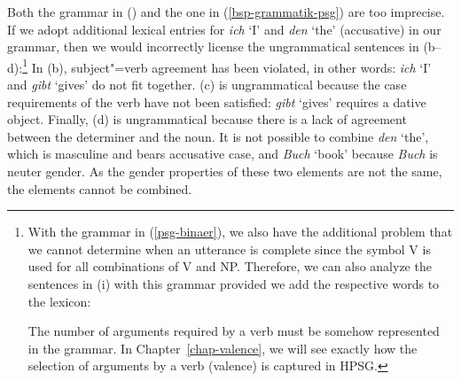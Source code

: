Both the grammar in () and the one in (\ref{bsp-grammatik-psg}) are too imprecise.
If we adopt additional lexical entries for \emph{ich} `I' and \emph{den} `the' (accusative) in our grammar, then we would incorrectly
license the ungrammatical sentences in (b--d):\footnote{\label{fn-ex-das-kind-erwartet}%
	With the grammar in (\ref{psg-binaer}), we also have the additional problem that we cannot determine when an utterance is complete
	since the symbol V is used for all combinations of V and NP. Therefore, we can also analyze
        the sentences in (i) with this grammar provided we add the respective words to the lexicon:
  
\eal
{}
\zl
The number of arguments required by a verb must be somehow represented in the grammar. In Chapter~\ref{chap-valence}, we will see exactly
how the selection of arguments by a verb (valence) is captured in HPSG.
}
\eal
{}
\zl
In (b), subject"=verb agreement has been violated, in other words: \emph{ich} `I' and \emph{gibt} `gives' do not fit together.
(c) is ungrammatical because the case requirements of the verb have not been satisfied: \emph{gibt} `gives' requires a dative object. Finally, (d) is ungrammatical
because there is a lack of agreement between the determiner and the noun. It is not possible to combine \emph{den} `the', which is masculine and bears accusative case, 
and \emph{Buch} `book' because \emph{Buch} is neuter gender. As the gender properties
of these two elements are not the same, the elements cannot be combined.

